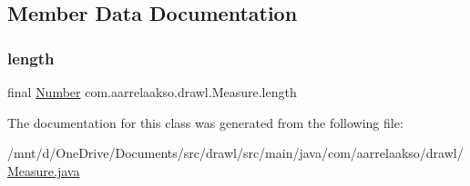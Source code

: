 \subsection{Member Data Documentation}
\mbox{\label{classcom_1_1aarrelaakso_1_1drawl_1_1_measure_aef040b9b0dd7d4a925448d0854c2444a}} 
\subsubsection{\texorpdfstring{length}{length}}
{\footnotesize\ttfamily final \hyperlink{interfacecom_1_1aarrelaakso_1_1drawl_1_1_number}{Number} com.\+aarrelaakso.\+drawl.\+Measure.\+length\hspace{0.3cm}{\ttfamily [private]}}



The documentation for this class was generated from the following file\+:\begin{DoxyCompactItemize}
\item 
/mnt/d/\+One\+Drive/\+Documents/src/drawl/src/main/java/com/aarrelaakso/drawl/\hyperlink{_measure_8java}{Measure.\+java}\end{DoxyCompactItemize}
